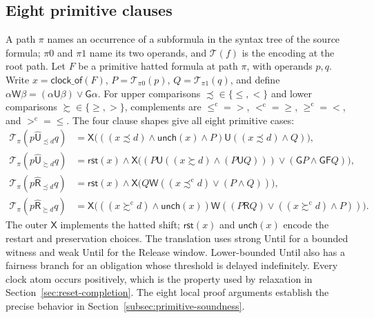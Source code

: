 \documentclass[manuscript]{acmart}
\newcommand{\Until}{\mathbin{\mathsf{U}}}
\newcommand{\Release}{\mathbin{\mathsf{R}}}
\newcommand{\hUntil}{\mathbin{\widehat{\mathsf{U}}}}
\newcommand{\hRelease}{\mathbin{\widehat{\mathsf{R}}}}
\newcommand{\Next}{\mathsf{X}}
\newcommand{\Always}{\mathsf{G}}
\newcommand{\Eventually}{\mathsf{F}}
\newcommand{\WeakUntil}{\mathbin{\mathsf{W}}}
\providecommand{\Reset}{}\renewcommand{\Reset}{\mathsf{rst}}
\newcommand{\Unch}{\mathsf{unch}}
\newcommand{\T}{\mathcal{T}}
\begin{document}
\subsection{Eight primitive clauses}
\label{sec:mtlbuchi}
A path $\pi$ names an occurrence of a subformula in the syntax tree of the
source formula; $\pi0$ and $\pi1$ name its two operands, and $\T(f)$ is the
encoding at the root path. Let $F$ be a primitive hatted formula at path $\pi$,
with operands $p,q$.
Write $x=\mathsf{clock\_of}(F)$, $P=\T_{\pi0}(p)$,
$Q=\T_{\pi1}(q)$, and define
$\alpha\WeakUntil\beta=(\alpha\Until\beta)\lor\Always\alpha$.
For upper comparisons $\precsim\in\{\le,<\}$ and lower comparisons
$\succsim\in\{\ge,>\}$, complements are
$\le^{\mathrm c}=>$, $<^{\mathrm c}=\ge$, $\ge^{\mathrm c}=<$, and
$>^{\mathrm c}=\le$. The four clause shapes give all eight primitive cases:
\begingroup\small
\begin{align}
\T_\pi(p\hUntil_{\precsim d}q)
 &=\Next\bigl(((x\precsim d)\land\Unch(x)\land P)\Until((x\precsim d)\land Q)\bigr),\label{eq:t-hule}\\
\T_\pi(p\hUntil_{\succsim d}q)
 &=\Reset(x)\land\Next\bigl((P\Until((x\succsim d)\land(P\Until Q)))\lor(\Always P\land\Always\Eventually Q)\bigr),\label{eq:t-huge}\\
\T_\pi(p\hRelease_{\precsim d}q)
 &=\Reset(x)\land\Next\bigl(Q\WeakUntil((x\mathrel{\precsim^{\mathrm c}}d)\lor(P\land Q))\bigr),\label{eq:t-hrle}\\
\T_\pi(p\hRelease_{\succsim d}q)
 &=\Next\bigl(((x\mathrel{\succsim^{\mathrm c}}d)\land\Unch(x))\WeakUntil((P\Release Q)\lor((x\mathrel{\succsim^{\mathrm c}}d)\land P))\bigr).
 \label{eq:t-hrge}
\end{align}
\endgroup
The outer $\Next$ implements the hatted shift; $\Reset(x)$ and $\Unch(x)$
encode the restart and preservation choices. The translation uses strong Until for a
bounded witness and weak Until for the Release window. Lower-bounded Until
also has a fairness branch for an obligation whose threshold is delayed
indefinitely. Every clock atom occurs positively, which is the property used
by relaxation in Section~\ref{sec:reset-completion}. The eight local proof
arguments establish the precise behavior in
Section~\ref{subsec:primitive-soundness}.
\end{document}
